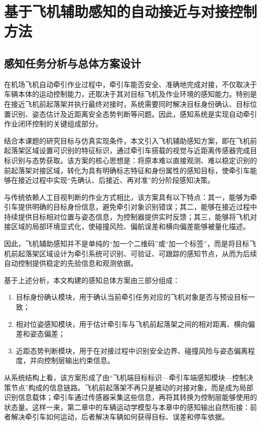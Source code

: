 \chapter{基于飞机辅助感知的自动接近与对接控制方法}

\section{感知任务分析与总体方案设计}

在机场飞机自动牵引作业过程中，牵引车能否安全、准确地完成对接，不仅取决于车辆本体的运动控制能力，还取决于其对目标飞机及作业环境的感知能力。特别是在接近飞机前起落架并执行最终对接时，系统需要同时解决目标身份确认、目标位置识别、姿态估计及近距离安全态势判断等问题。因此，感知系统是实现自动牵引作业闭环控制的关键组成部分\cite{ref18,ref29,ref30}。

结合本课题的研究目标与仿真实现条件，本文引入飞机辅助感知方案，即在飞机前起落架区域设置可识别的特征标识，通过牵引车搭载的视觉与近距离传感器完成目标识别与态势获取。该方案的核心思想是：将原本难以直接观测、难以稳定识别的前起落架对接区域，转化为具有明确标志特征和身份属性的感知目标，使牵引车能够在接近过程中实现``先确认、后接近、再对准''的分阶段感知决策\cite{ref29,ref30}。

与传统依赖人工目视判断的作业方式相比，该方案具有以下特点：其一，能够为牵引车提供明确的目标身份信息，避免牵引对象识别错误；其二，能够在接近过程中持续提供目标相对位置与姿态信息，为控制器提供实时反馈；其三，能够将飞机对接区域的局部环境显式化，使碰撞风险、偏航误差和横向偏差能够被量化描述。

因此，飞机辅助感知并不是单纯的``加一个二维码''或``加一个标签''，而是将目标飞机前起落架区域设计为牵引系统可识别、可验证、可跟踪的感知节点，从而为后续自动控制提供稳定的先验信息和观测依据。

基于上述分析，本文构建的感知总体方案由三部分组成：
\begin{enumerate}[label=（\arabic*）,leftmargin=2em]
\item 目标身份确认模块，用于确认当前牵引任务对应的飞机对象是否与预设目标一致；
\item 相对位姿感知模块，用于估计牵引车与飞机前起落架之间的相对距离、横向偏差和姿态偏差；
\item 近距态势判断模块，用于在对接过程中识别安全边界、碰撞风险与姿态偏离程度，并向控制层输出约束信息。
\end{enumerate}

从系统结构上看，该方案形成了由``飞机端目标标识---牵引车端感知模块---控制决策节点''构成的信息链路。飞机前起落架不再只是被动的对接对象，而是成为局部识别信息载体；牵引车通过传感器采集这些信息，再将其转换为控制层能够使用的状态量。这样一来，第二章中的车辆运动学模型与本章中的感知输出自然衔接：前者解决牵引车如何运动，后者解决车辆如何获得目标、误差和停车依据。

